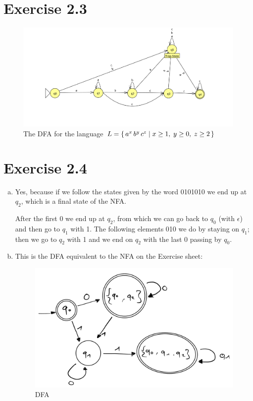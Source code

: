 \documentclass{article} %
\newcommand{\homeworkNumber}{2}
\begin{document}
\section*{Exercise \homeworkNumber.3}
\begin{figure}[H]
	\includegraphics[width=\linewidth]{ex3.png}
	\centering
	\caption{The DFA for the language $L = \set{a^x \, b^y \, c^z \mid x \ge 1,\; y \ge 0,\; z \ge 2}$}
\end{figure}

\clearpage

\section*{Exercise \homeworkNumber.4}
\begin{enumerate}[(a)]
	\item
	Yes, because if we follow the states given by the word 0101010 we end up at
	$q_2$, which is a final state of the NFA.
	
	After the first 0 we end up at $q_2$, from which we can go back to $q_0$ (with $\epsilon$) and then
	go to $q_1$ with 1. The following elements 010 we do by staying on $q_1$; then we go to $q_2$ with 1
	and we end on $q_2$ with the last 0 passing by $q_0$.

	\item
	This is the DFA equivalent to the NFA on the Exercise sheet:
	\begin{figure}[H]
		\includegraphics[width=\linewidth]{ex4b.png}
		\centering
		\caption{DFA}
	\end{figure}
\end{enumerate}
\end{document}
